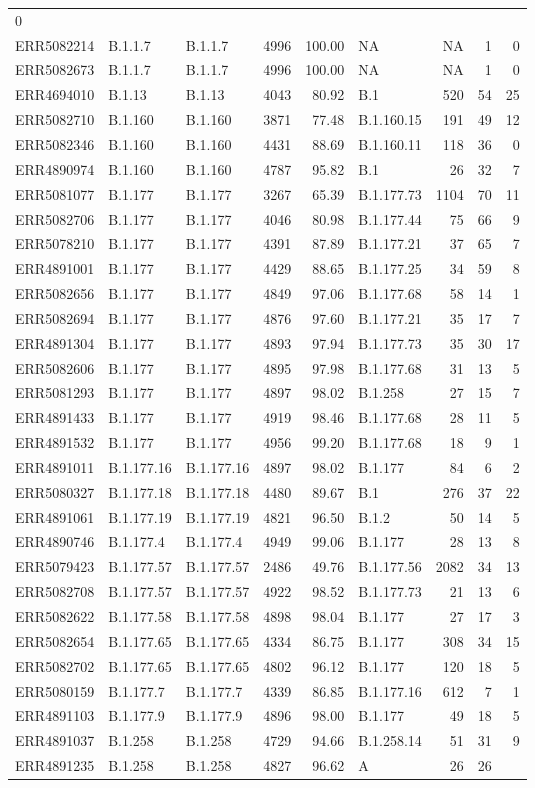 \documentclass[
]{article}
\begin{document}
\begin{longtable}[]{@{}lllrrlrrr@{}}
0\tabularnewline
ERR5082214 & B.1.1.7 & B.1.1.7 & 4996 & 100.00 & NA & NA & 1 &
0\tabularnewline
ERR5082673 & B.1.1.7 & B.1.1.7 & 4996 & 100.00 & NA & NA & 1 &
0\tabularnewline
ERR4694010 & B.1.13 & B.1.13 & 4043 & 80.92 & B.1 & 520 & 54 &
25\tabularnewline
ERR5082710 & B.1.160 & B.1.160 & 3871 & 77.48 & B.1.160.15 & 191 & 49 &
12\tabularnewline
ERR5082346 & B.1.160 & B.1.160 & 4431 & 88.69 & B.1.160.11 & 118 & 36 &
0\tabularnewline
ERR4890974 & B.1.160 & B.1.160 & 4787 & 95.82 & B.1 & 26 & 32 &
7\tabularnewline
ERR5081077 & B.1.177 & B.1.177 & 3267 & 65.39 & B.1.177.73 & 1104 & 70 &
11\tabularnewline
ERR5082706 & B.1.177 & B.1.177 & 4046 & 80.98 & B.1.177.44 & 75 & 66 &
9\tabularnewline
ERR5078210 & B.1.177 & B.1.177 & 4391 & 87.89 & B.1.177.21 & 37 & 65 &
7\tabularnewline
ERR4891001 & B.1.177 & B.1.177 & 4429 & 88.65 & B.1.177.25 & 34 & 59 &
8\tabularnewline
ERR5082656 & B.1.177 & B.1.177 & 4849 & 97.06 & B.1.177.68 & 58 & 14 &
1\tabularnewline
ERR5082694 & B.1.177 & B.1.177 & 4876 & 97.60 & B.1.177.21 & 35 & 17 &
7\tabularnewline
ERR4891304 & B.1.177 & B.1.177 & 4893 & 97.94 & B.1.177.73 & 35 & 30 &
17\tabularnewline
ERR5082606 & B.1.177 & B.1.177 & 4895 & 97.98 & B.1.177.68 & 31 & 13 &
5\tabularnewline
ERR5081293 & B.1.177 & B.1.177 & 4897 & 98.02 & B.1.258 & 27 & 15 &
7\tabularnewline
ERR4891433 & B.1.177 & B.1.177 & 4919 & 98.46 & B.1.177.68 & 28 & 11 &
5\tabularnewline
ERR4891532 & B.1.177 & B.1.177 & 4956 & 99.20 & B.1.177.68 & 18 & 9 &
1\tabularnewline
ERR4891011 & B.1.177.16 & B.1.177.16 & 4897 & 98.02 & B.1.177 & 84 & 6 &
2\tabularnewline
ERR5080327 & B.1.177.18 & B.1.177.18 & 4480 & 89.67 & B.1 & 276 & 37 &
22\tabularnewline
ERR4891061 & B.1.177.19 & B.1.177.19 & 4821 & 96.50 & B.1.2 & 50 & 14 &
5\tabularnewline
ERR4890746 & B.1.177.4 & B.1.177.4 & 4949 & 99.06 & B.1.177 & 28 & 13 &
8\tabularnewline
ERR5079423 & B.1.177.57 & B.1.177.57 & 2486 & 49.76 & B.1.177.56 & 2082
& 34 & 13\tabularnewline
ERR5082708 & B.1.177.57 & B.1.177.57 & 4922 & 98.52 & B.1.177.73 & 21 &
13 & 6\tabularnewline
ERR5082622 & B.1.177.58 & B.1.177.58 & 4898 & 98.04 & B.1.177 & 27 & 17
& 3\tabularnewline
ERR5082654 & B.1.177.65 & B.1.177.65 & 4334 & 86.75 & B.1.177 & 308 & 34
& 15\tabularnewline
ERR5082702 & B.1.177.65 & B.1.177.65 & 4802 & 96.12 & B.1.177 & 120 & 18
& 5\tabularnewline
ERR5080159 & B.1.177.7 & B.1.177.7 & 4339 & 86.85 & B.1.177.16 & 612 & 7
& 1\tabularnewline
ERR4891103 & B.1.177.9 & B.1.177.9 & 4896 & 98.00 & B.1.177 & 49 & 18 &
5\tabularnewline
ERR4891037 & B.1.258 & B.1.258 & 4729 & 94.66 & B.1.258.14 & 51 & 31 &
9\tabularnewline
ERR4891235 & B.1.258 & B.1.258 & 4827 & 96.62 & A & 26 & 26 &

\end{longtable}
\end{document}
